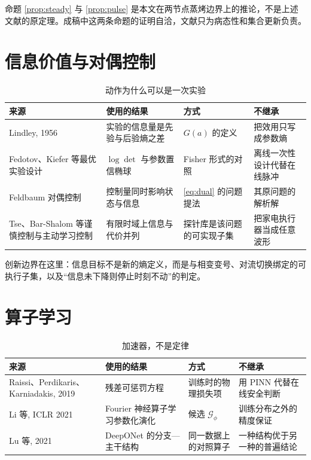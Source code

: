 命题 \ref{prop:steady} 与 \ref{prop:pulse} 是本文在两节点蒸烤边界上的推论，不是上述文献的原定理。成稿中这两条命题的证明自洽，文献只为病态性和集合更新负责。

\section{信息价值与对偶控制}

\begin{table}[H]
\centering
\caption{动作为什么可以是一次实验}
\begin{tabularx}{\textwidth}{lXll}
\toprule
来源 & 使用的结果 & 方式 & 不继承 \\
\midrule
Lindley, 1956 & 实验的信息量是先验与后验熵之差 & $G(a)$ 的定义 & 把效用只写成参数熵 \\
Fedotov、Kiefer 等最优实验设计 & $\log\det$ 与参数置信椭球 & Fisher 形式的对照 & 离线一次性设计代替在线脉冲 \\
Feldbaum 对偶控制 & 控制量同时影响状态与信息 & \eqref{eq:dual} 的问题提法 & 其原问题的解析解 \\
Tse、Bar-Shalom 等谨慎控制与主动学习控制 & 有限时域上信息与代价并列 & 探针库是该问题的可实现子集 & 把家电执行器当成任意波形 \\
\bottomrule
\end{tabularx}
\end{table}

创新边界在这里：信息目标不是新的熵定义，而是与相变变号、对流切换绑定的可执行子集，以及“信息未下降则停止时刻不动”的判定。

\section{算子学习}

\begin{table}[H]
\centering
\caption{加速器，不是定律}
\begin{tabularx}{\textwidth}{lXll}
\toprule
来源 & 使用的结果 & 方式 & 不继承 \\
\midrule
Raissi、Perdikaris、Karniadakis, 2019 & 残差可惩罚方程 & 训练时的物理损失项 & 用 PINN 代替在线安全判断 \\
Li 等, ICLR 2021 & Fourier 神经算子学习参数化演化 & 候选 $\mathcal{G}_\phi$ & 训练分布之外的精度保证 \\
Lu 等, 2021 & DeepONet 的分支—主干结构 & 同一数据上的对照算子 & 一种结构优于另一种的普遍结论 \\
\bottomrule
\end{tabularx}
\end{table}


